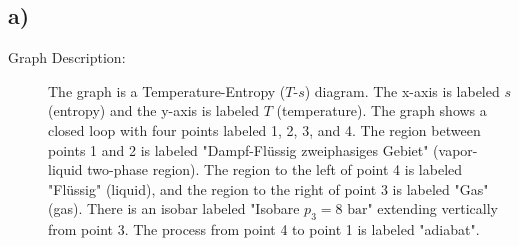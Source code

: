 

\subsection*{a)}

\begin{description}
    \item[Graph Description:] The graph is a Temperature-Entropy ($T$-$s$) diagram. The x-axis is labeled $s$ (entropy) and the y-axis is labeled $T$ (temperature). The graph shows a closed loop with four points labeled 1, 2, 3, and 4. The region between points 1 and 2 is labeled "Dampf-Flüssig zweiphasiges Gebiet" (vapor-liquid two-phase region). The region to the left of point 4 is labeled "Flüssig" (liquid), and the region to the right of point 3 is labeled "Gas" (gas). There is an isobar labeled "Isobare $p_3 = 8 \text{ bar}$" extending vertically from point 3. The process from point 4 to point 1 is labeled "adiabat".
\end{description}